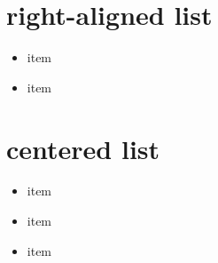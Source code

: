 \chapter{right-aligned list}

\begin{flushright}
\begin{itemize}
\item item
\item item
\end{itemize}

\end{flushright}
\chapter{centered list}

\begin{center}
\begin{itemize}
\item item
\item item
\item item
\end{itemize}

\end{center}
